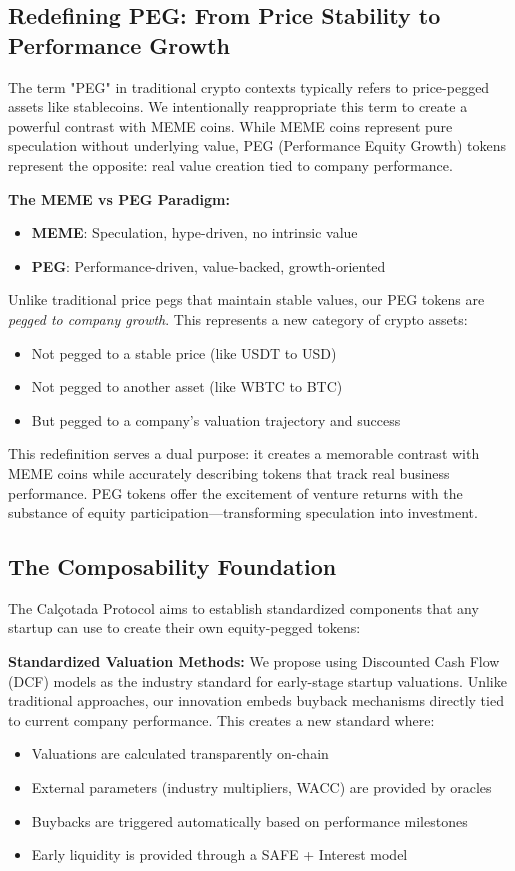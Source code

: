 \documentclass[conference]{IEEEtran}
\begin{document}
\subsection{Redefining PEG: From Price Stability to Performance Growth}

The term "PEG" in traditional crypto contexts typically refers to price-pegged assets like stablecoins. We intentionally reappropriate this term to create a powerful contrast with MEME coins. While MEME coins represent pure speculation without underlying value, PEG (Performance Equity Growth) tokens represent the opposite: real value creation tied to company performance.

\textbf{The MEME vs PEG Paradigm:}
\begin{itemize}
    \item \textbf{MEME}: Speculation, hype-driven, no intrinsic value
    \item \textbf{PEG}: Performance-driven, value-backed, growth-oriented
\end{itemize}

Unlike traditional price pegs that maintain stable values, our PEG tokens are \textit{pegged to company growth}. This represents a new category of crypto assets:
\begin{itemize}
    \item Not pegged to a stable price (like USDT to USD)
    \item Not pegged to another asset (like WBTC to BTC)
    \item But pegged to a company's valuation trajectory and success
\end{itemize}

This redefinition serves a dual purpose: it creates a memorable contrast with MEME coins while accurately describing tokens that track real business performance. PEG tokens offer the excitement of venture returns with the substance of equity participation—transforming speculation into investment.

\subsection{The Composability Foundation}

The Calçotada Protocol aims to establish standardized components that any startup can use to create their own equity-pegged tokens:

\textbf{Standardized Valuation Methods:}
We propose using Discounted Cash Flow (DCF) models as the industry standard for early-stage startup valuations. Unlike traditional approaches, our innovation embeds buyback mechanisms directly tied to current company performance. This creates a new standard where:
\begin{itemize}
    \item Valuations are calculated transparently on-chain
    \item External parameters (industry multipliers, WACC) are provided by oracles
    \item Buybacks are triggered automatically based on performance milestones
    \item Early liquidity is provided through a SAFE + Interest model
\end{itemize}
\end{document}
